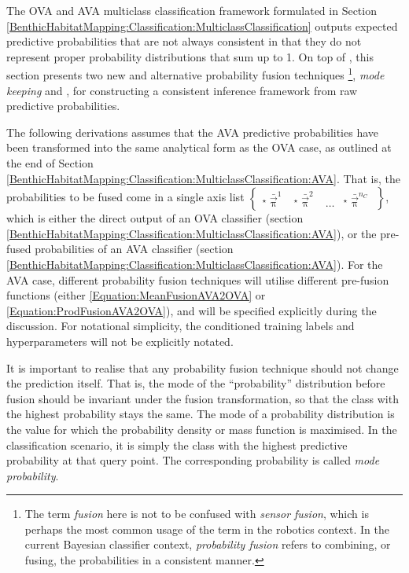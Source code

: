				The OVA and AVA multiclass classification framework formulated in Section \ref{BenthicHabitatMapping:Classification:MulticlassClassification} outputs expected predictive probabilities that are not always consistent in that they do not represent proper probability distributions that sum up to 1. On top of , this section presents two new and alternative probability fusion techniques \footnote{The term \textit{fusion} here is not to be confused with \textit{sensor fusion}, which is perhaps the most common usage of the term in the robotics context. In the current Bayesian classifier context, \textit{probability fusion} refers to combining, or fusing, the probabilities in a consistent manner.}, \textit{mode keeping} and , for constructing a consistent inference framework from raw predictive probabilities.
				
				The following derivations assumes that the AVA predictive probabilities have been transformed into the same analytical form as the OVA case, as outlined at the end of Section \ref{BenthicHabitatMapping:Classification:MulticlassClassification:AVA}. That is, the probabilities to be fused come in a single axis list $\begin{Bmatrix*} {^{\star}}\bar{\vec{\uppi}}^{1} & {^{\star}}\bar{\vec{\uppi}}^{2} & \dots & {^{\star}}\bar{\vec{\uppi}}^{n_{C}} \end{Bmatrix*}$, which is either the direct output of an OVA classifier (section \ref{BenthicHabitatMapping:Classification:MulticlassClassification:AVA}), or the pre-fused probabilities of an AVA classifier (section \ref{BenthicHabitatMapping:Classification:MulticlassClassification:AVA}). For the AVA case, different probability fusion techniques will utilise different pre-fusion functions (either \eqref{Equation:MeanFusionAVA2OVA} or \eqref{Equation:ProdFusionAVA2OVA}), and will be specified explicitly during the discussion. For notational simplicity, the conditioned training labels and hyperparameters will not be explicitly notated.
			
				It is important to realise that any probability fusion technique should not change the prediction itself. That is, the mode of the ``probability'' distribution before fusion should be invariant under the fusion transformation, so that the class with the highest probability stays the same. The mode of a probability distribution is the value for which the probability density or mass function is maximised. In the classification scenario, it is simply the class with the highest predictive probability at that query point. The corresponding probability is called \textit{mode probability}.
					
